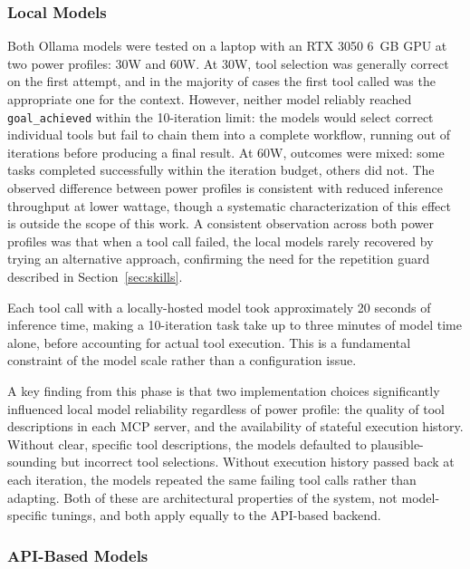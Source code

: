 \documentclass[conference]{IEEEtran}
\begin{document}
\subsubsection{Local Models}

Both Ollama models were tested on a laptop with an RTX 3050 6~GB GPU at two power profiles: 30W and 60W. At 30W, tool selection was generally correct on the first attempt, and in the majority of cases the first tool called was the appropriate one for the context. However, neither model reliably reached \texttt{goal\_achieved} within the 10-iteration limit: the models would select correct individual tools but fail to chain them into a complete workflow, running out of iterations before producing a final result. At 60W, outcomes were mixed: some tasks completed successfully within the iteration budget, others did not. The observed difference between power profiles is consistent with reduced inference throughput at lower wattage, though a systematic characterization of this effect is outside the scope of this work. A consistent observation across both power profiles was that when a tool call failed, the local models rarely recovered by trying an alternative approach, confirming the need for the repetition guard described in Section~\ref{sec:skills}.

Each tool call with a locally-hosted model took approximately 20 seconds of inference time, making a 10-iteration task take up to three minutes of model time alone, before accounting for actual tool execution. This is a fundamental constraint of the model scale rather than a configuration issue.

A key finding from this phase is that two implementation choices significantly influenced local model reliability regardless of power profile: the quality of tool descriptions in each MCP server, and the availability of stateful execution history. Without clear, specific tool descriptions, the models defaulted to plausible-sounding but incorrect tool selections. Without execution history passed back at each iteration, the models repeated the same failing tool calls rather than adapting. Both of these are architectural properties of the system, not model-specific tunings, and both apply equally to the API-based backend.

\subsubsection{API-Based Models}
\end{document}
